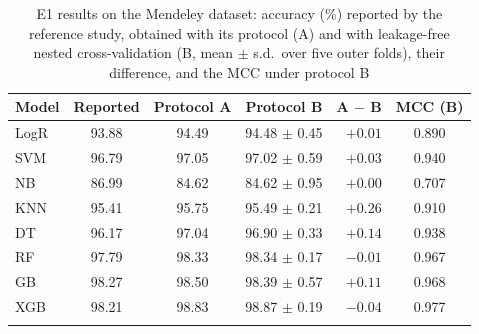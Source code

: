 \begin{table}[htbp]
\caption{E1 results on the Mendeley dataset: accuracy (\%) reported by the reference study, obtained with its protocol (A) and with leakage-free nested cross-validation (B, mean $\pm$ s.d.\ over five outer folds), their difference, and the MCC under protocol B}\label{tab:e1-mendeley}%
\begin{tabular}{@{}lcccrc@{}}
\toprule
Model & Reported & Protocol A & Protocol B & A $-$ B & MCC (B) \\
\midrule
LogR & 93.88 & 94.49 & 94.48 $\pm$ 0.45 & $+0.01$ & 0.890 \\
SVM & 96.79 & 97.05 & 97.02 $\pm$ 0.59 & $+0.03$ & 0.940 \\
NB & 86.99 & 84.62 & 84.62 $\pm$ 0.95 & $+0.00$ & 0.707 \\
KNN & 95.41 & 95.75 & 95.49 $\pm$ 0.21 & $+0.26$ & 0.910 \\
DT & 96.17 & 97.04 & 96.90 $\pm$ 0.33 & $+0.14$ & 0.938 \\
RF & 97.79 & 98.33 & 98.34 $\pm$ 0.17 & $-0.01$ & 0.967 \\
GB & 98.27 & 98.50 & 98.39 $\pm$ 0.57 & $+0.11$ & 0.968 \\
XGB & 98.21 & 98.83 & 98.87 $\pm$ 0.19 & $-0.04$ & 0.977 \\
\botrule
\end{tabular}
\end{table}
